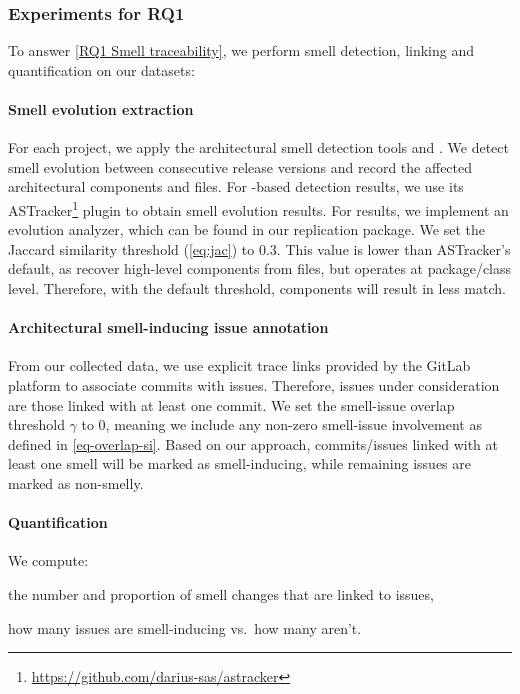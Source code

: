 \subsubsection{Experiments for RQ1}
To answer \ref{RQ1 Smell traceability}, we perform smell detection, linking and quantification on our datasets:
\paragraph{Smell evolution extraction}
For each project, we apply the architectural smell detection tools \ARCADE \cite{schmittlaser_ARCADEExtensible_2020} and \Arcan \cite{fontana_2017}. %
We detect smell evolution between consecutive release versions and record the affected architectural components and files.
For \Arcan-based detection results, we use its ASTracker\footnote{\url{https://github.com/darius-sas/astracker}} plugin to obtain smell evolution results.
For \ARCADE results, we implement an evolution analyzer, which can be found in our replication package\cite{replication}. We set the Jaccard similarity threshold (\autoref{eq:jac}) to 0.3.
This value is lower than ASTracker's default, as \ARCADE recover high-level components from files, but \Arcan operates at package/class level.
Therefore, with the default threshold, \ARCADE components will result in less match. 





\paragraph{Architectural smell-inducing issue annotation}
From our collected data, we use explicit trace links provided by the GitLab platform to associate commits with issues.
Therefore, issues under consideration are those linked with at least one commit.
We set the smell-issue overlap threshold $\gamma$ to 0, meaning we include any non-zero smell-issue involvement as defined in \autoref{eq-overlap-si}.
Based on our approach, commits/issues linked with at least one smell will be marked as smell-inducing, while remaining issues are marked as non-smelly.
\paragraph{Quantification}
We compute:
\begin{enumerate*}[label=(\roman*)]
    \item the number and proportion of smell changes that are linked to issues,
    \item how many issues are smell-inducing vs.\ how many aren't.
\end{enumerate*}

